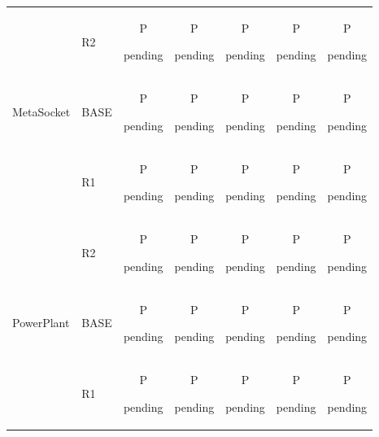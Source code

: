 \begin{tabular}{@{}llccccc@{}}
 & R2 & \shortstack[c]{\strut P\\[-3pt]\strut pending} & \shortstack[c]{\strut P\\[-3pt]\strut pending} & \shortstack[c]{\strut P\\[-3pt]\strut pending} & \shortstack[c]{\strut P\\[-3pt]\strut pending} & \shortstack[c]{\strut P\\[-3pt]\strut pending}\\
\addlinespace[2pt]
MetaSocket & BASE & \shortstack[c]{\strut P\\[-3pt]\strut pending} & \shortstack[c]{\strut P\\[-3pt]\strut pending} & \shortstack[c]{\strut P\\[-3pt]\strut pending} & \shortstack[c]{\strut P\\[-3pt]\strut pending} & \shortstack[c]{\strut P\\[-3pt]\strut pending}\\
 & R1 & \shortstack[c]{\strut P\\[-3pt]\strut pending} & \shortstack[c]{\strut P\\[-3pt]\strut pending} & \shortstack[c]{\strut P\\[-3pt]\strut pending} & \shortstack[c]{\strut P\\[-3pt]\strut pending} & \shortstack[c]{\strut P\\[-3pt]\strut pending}\\
 & R2 & \shortstack[c]{\strut P\\[-3pt]\strut pending} & \shortstack[c]{\strut P\\[-3pt]\strut pending} & \shortstack[c]{\strut P\\[-3pt]\strut pending} & \shortstack[c]{\strut P\\[-3pt]\strut pending} & \shortstack[c]{\strut P\\[-3pt]\strut pending}\\
\addlinespace[2pt]
PowerPlant & BASE & \shortstack[c]{\strut P\\[-3pt]\strut pending} & \shortstack[c]{\strut P\\[-3pt]\strut pending} & \shortstack[c]{\strut P\\[-3pt]\strut pending} & \shortstack[c]{\strut P\\[-3pt]\strut pending} & \shortstack[c]{\strut P\\[-3pt]\strut pending}\\
 & R1 & \shortstack[c]{\strut P\\[-3pt]\strut pending} & \shortstack[c]{\strut P\\[-3pt]\strut pending} & \shortstack[c]{\strut P\\[-3pt]\strut pending} & \shortstack[c]{\strut P\\[-3pt]\strut pending} & \shortstack[c]{\strut P\\[-3pt]\strut pending}\\

\end{tabular}
